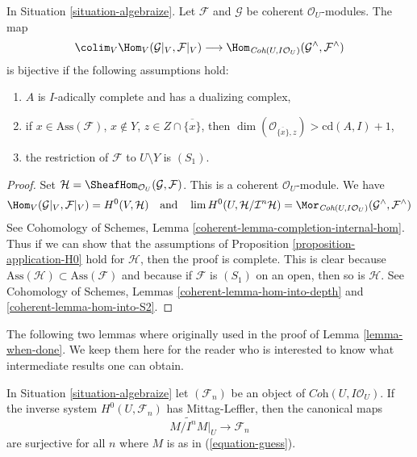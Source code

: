 \begin{lemma}
\label{lemma-fully-faithful}
In Situation \ref{situation-algebraize}. Let $\mathcal{F}$ and $\mathcal{G}$
be coherent $\mathcal{O}_U$-modules. The map
$$
\colim_V \Hom_V(\mathcal{G}|_V, \mathcal{F}|_V)
\longrightarrow
\Hom_{\textit{Coh}(U, I\mathcal{O}_U)}(\mathcal{G}^\wedge, \mathcal{F}^\wedge)
$$
is bijective if the following assumptions hold:
\begin{enumerate}
\item $A$ is $I$-adically complete and has a dualizing complex,
\item if $x \in \text{Ass}(\mathcal{F})$, $x \not \in Y$,
$z \in Z \cap \overline{\{x\}}$, then
$\dim(\mathcal{O}_{\overline{\{x\}}, z}) > \text{cd}(A, I) + 1$,
\item the restriction of $\mathcal{F}$ to $U \setminus Y$ is $(S_1)$.
\end{enumerate}
\end{lemma}

\begin{proof}
Set $\mathcal{H} = \SheafHom_{\mathcal{O}_U}(\mathcal{G}, \mathcal{F})$.
This is a coherent $\mathcal{O}_U$-module. We have
$$
\Hom_V(\mathcal{G}|_V, \mathcal{F}|_V) =
H^0(V, \mathcal{H})
\quad\text{and}\quad
\lim H^0(U, \mathcal{H}/\mathcal{I}^n\mathcal{H}) =
\Mor_{\textit{Coh}(U, I\mathcal{O}_U)}
(\mathcal{G}^\wedge, \mathcal{F}^\wedge)
$$
See Cohomology of Schemes, Lemma \ref{coherent-lemma-completion-internal-hom}.
Thus if we can show that the assumptions of
Proposition \ref{proposition-application-H0}
hold for $\mathcal{H}$, then the proof is complete.
This is clear because
$\text{Ass}(\mathcal{H}) \subset \text{Ass}(\mathcal{F})$
and because if $\mathcal{F}$ is $(S_1)$ on an open, then so is $\mathcal{H}$.
See Cohomology of Schemes, Lemmas
\ref{coherent-lemma-hom-into-depth} and
\ref{coherent-lemma-hom-into-S2}.
\end{proof}

\noindent
The following two lemmas where originally used in the proof
of Lemma \ref{lemma-when-done}. We keep them here for the reader who is
interested to know what intermediate results one can obtain.

\begin{lemma}
\label{lemma-when-ML}
In Situation \ref{situation-algebraize} let $(\mathcal{F}_n)$ be an object
of $\textit{Coh}(U, I\mathcal{O}_U)$. If the inverse system
$H^0(U, \mathcal{F}_n)$ has Mittag-Leffler, then the canonical maps
$$
\widetilde{M/I^nM}|_U \to \mathcal{F}_n
$$
are surjective for all $n$ where $M$ is as in (\ref{equation-guess}).
\end{lemma}

